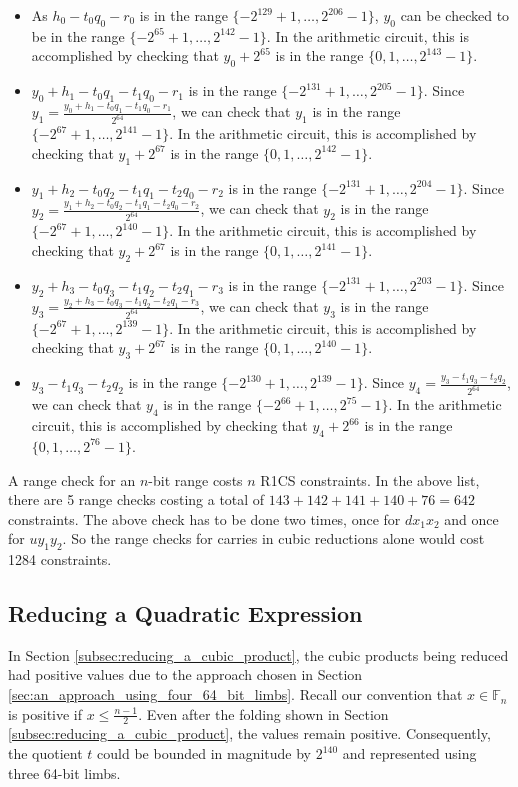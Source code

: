 \documentclass[a4paper, 12pt]{article}
\begin{document}
\begin{itemize}
  \item As $h_0 - t_0q_0-r_0$ is in the range $\{-2^{129}+1,\ldots, 2^{206}-1\}$, $y_0$ can be checked to be in the range $\{-2^{65}+1,\ldots, 2^{142}-1\}$. In the arithmetic circuit, this is accomplished by checking that $y_0 + 2^{65}$ is in the range $\{0,1,\ldots,2^{143}-1\}$.
  \item $y_0+h_1-t_0q_1-t_1q_0-r_1$ is in the range $\{-2^{131}+1,\ldots, 2^{205}-1\}$. Since $y_1 = \frac{y_0+h_1-t_0q_1-t_1q_0-r_1}{2^{64}}$, we can check that $y_1$ is in the range $\{-2^{67}+1,\ldots, 2^{141}-1\}$. In the arithmetic circuit, this is accomplished by checking that $y_1 + 2^{67}$ is in the range $\{0,1,\ldots,2^{142}-1\}$.
  \item $y_1+h_2-t_0q_2-t_1q_1-t_2q_0-r_2$ is in the range $\{-2^{131}+1,\ldots, 2^{204}-1\}$. Since $y_2 = \frac{y_1+h_2-t_0q_2-t_1q_1-t_2q_0-r_2}{2^{64}}$, we can check that $y_2$ is in the range $\{-2^{67}+1,\ldots, 2^{140}-1\}$. In the arithmetic circuit, this is accomplished by checking that $y_2 + 2^{67}$ is in the range $\{0,1,\ldots,2^{141}-1\}$.
  \item $y_2+h_3-t_0q_3-t_1q_2-t_2q_1-r_3$ is in the range $\{-2^{131}+1,\ldots, 2^{203}-1\}$. Since $y_3 = \frac{y_2+h_3-t_0q_3-t_1q_2-t_2q_1-r_3}{2^{64}}$, we can check that $y_3$ is in the range $\{-2^{67}+1,\ldots, 2^{139}-1\}$. In the arithmetic circuit, this is accomplished by checking that $y_3 + 2^{67}$ is in the range $\{0,1,\ldots,2^{140}-1\}$.
  \item $y_3-t_1q_3-t_2q_2$ is in the range $\{-2^{130}+1,\ldots, 2^{139}-1\}$. Since $y_4 = \frac{y_3-t_1q_3-t_2q_2}{2^{64}}$, we can check that $y_4$ is in the range $\{-2^{66}+1,\ldots, 2^{75}-1\}$. In the arithmetic circuit, this is accomplished by checking that $y_4 + 2^{66}$ is in the range $\{0,1,\ldots,2^{76}-1\}$.
\end{itemize}

A range check for an $n$-bit range costs $n$ R1CS constraints. In the above list, there are 5 range checks costing a total of $143 + 142+ 141 + 140 + 76 = 642$ constraints. The above check has to be done two times, once for $dx_1x_2$ and once for $uy_1y_2$. So the range checks for carries in cubic reductions alone would cost 1284 constraints.
\subsection{Reducing a Quadratic Expression}%
\label{subsec:reducing_a_quadratic_expression}
In Section \ref{subsec:reducing_a_cubic_product}, the cubic products being reduced had positive values due to the approach chosen in Section \ref{sec:an_approach_using_four_64_bit_limbs}. Recall our convention that $x \in \mathbb{F}_n$ is positive if $x \le \frac{n-1}{2}$. Even after the folding shown in Section \ref{subsec:reducing_a_cubic_product}, the values remain positive. Consequently, the quotient $t$ could be bounded in magnitude by $2^{140}$ and represented using three 64-bit limbs.
\end{document}
